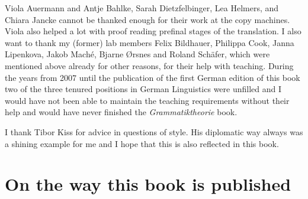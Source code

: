 Viola Auermann and Antje Bahlke, Sarah Dietzfelbinger, Lea Helmers, and Chiara Jancke cannot be thanked enough for their work at the copy machines. Viola
also helped a lot with proof reading prefinal stages of the translation.
I also want to thank my (former) lab members Felix Bildhauer, Philippa Cook, Janna Lipenkova, Jakob Maché,
Bjarne Ørsnes and Roland Schäfer, which were mentioned above already
for other reasons, for their help with teaching. During the years from 2007 until the publication of
the first German edition of this book two of the three tenured positions in German Linguistics were
unfilled and I would have not been able to maintain the teaching requirements without their help and
would have never finished the \emph{Grammatiktheorie} book.

I thank Tibor Kiss for advice in questions of style. His diplomatic way always was a shining
example for me and I hope that this is also reflected in this book.


\section*{On the way this book is published}

